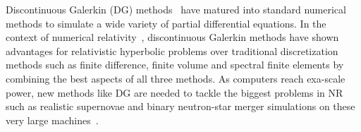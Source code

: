 


Discontinuous Galerkin (DG) methods~\cite{Reed.W;Hill.T1973,hesthaven2008nodal, Cock01,cockburn1998runge,Cockburn.B;Karniadakis.G;Shu.C2000}
have matured into standard numerical methods  to simulate a wide
variety of partial differential equations. In the context of numerical
relativity~\cite{baumgarte2010numerical}, discontinuous Galerkin
methods have shown advantages for relativistic hyperbolic problems
over traditional discretization methods such as finite difference, finite volume and
spectral finite elements
\cite{Field:2010mn,brown2012numerical,field2009discontinuous,zumbusch2009,Radice:2011qr,mocz:14,zanotti:14,endeve:15,teukolsky2015,Bugner:2015gqa,schaal2015astrophysicalfixed,zanotti2015,Miller:2016vik} by combining the best aspects of all three methods. As computers reach exa-scale power, new methods like DG are needed to tackle the biggest problems in NR such as realistic supernovae and binary neutron-star merger simulations on these very large machines~\cite{kidder:16}.

